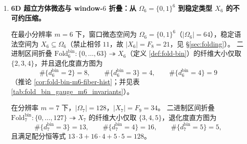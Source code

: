 \begin{enumerate}
  \begin{remark}\label{rem:terminal-time-golden-rotation-operational}
  在协议层“时间=迭代计数”的本体刻画（定理 \ref{thm:terminal-time-protocol-golden-branch}）之外，若以定义 \ref{def:terminal-reset-events} 的复位事件作为事件时钟刻度，则其指示序列由定理 \ref{thm:terminal-reset-events-sturmian} 给出为 slope \(\varphi^{-1}\) 的 Sturmian 过程，等价于黄金角旋转的符号编码。
  因此，“时间=黄金切面旋转”在本文框架中的严格含义是：时间推进在有限窗口观测下存在一个以黄金旋转返回时间结构实现的等价接口，而非将 tick 本身同一化为旋转几何。
  \end{remark}

  \item \textbf{6D 超立方体微态与 window-\(6\) 折叠：从 \(\Omega_6=\{0,1\}^6\) 到稳定类型 \(X_6\) 的不可约压缩。}

  \begin{theorem}
  \label{thm:terminal-foldbin6-64-to-21-hist}
  在最小分辨率 \(m=6\) 下，窗口微态空间为 \(\Omega_6=\{0,1\}^6\)（\(|\Omega_6|=64\)），稳定语法空间为 \(X_6\subseteq\Omega_6\)（禁止相邻 \(11\)，故 \(|X_6|=F_8=21\)，见 \S\ref{sec:folding}）。
  二进制区间折叠 \(\mathrm{Fold}^{\mathrm{bin}}_6:\{0,\dots,63\}\twoheadrightarrow X_6\)（定义 \ref{def:fold-bin}）的纤维大小仅取
  \(\{2,3,4\}\)，并且退化度直方图为
  \[
  \#\{d^{\mathrm{bin}}_6=2\}=8,\qquad
  \#\{d^{\mathrm{bin}}_6=3\}=4,\qquad
  \#\{d^{\mathrm{bin}}_6=4\}=9
  \]
  （推论 \ref{cor:fold-bin-m6-fiber-hist}；并见表 \ref{tab:fold_bin_gauge_m6_invariants}）。
  \end{theorem}

  \begin{theorem}\label{thm:terminal-foldbin7-128-to-34-hist}
  在分辨率 \(m=7\) 下，\(|\Omega_7|=128\)，\(|X_7|=F_9=34\)。
  二进制区间折叠 \(\mathrm{Fold}^{\mathrm{bin}}_7:\{0,\dots,127\}\twoheadrightarrow X_7\) 的纤维大小仅取
  \(\{3,4,5\}\)，退化度直方图为
  \[
  \#\{d^{\mathrm{bin}}_7=3\}=13,\qquad
  \#\{d^{\mathrm{bin}}_7=4\}=16,\qquad
  \#\{d^{\mathrm{bin}}_7=5\}=5,
  \]
  且满足配分恒等式 \(13\cdot 3+16\cdot 4+5\cdot 5=128\)。
  \end{theorem}


\end{enumerate}
